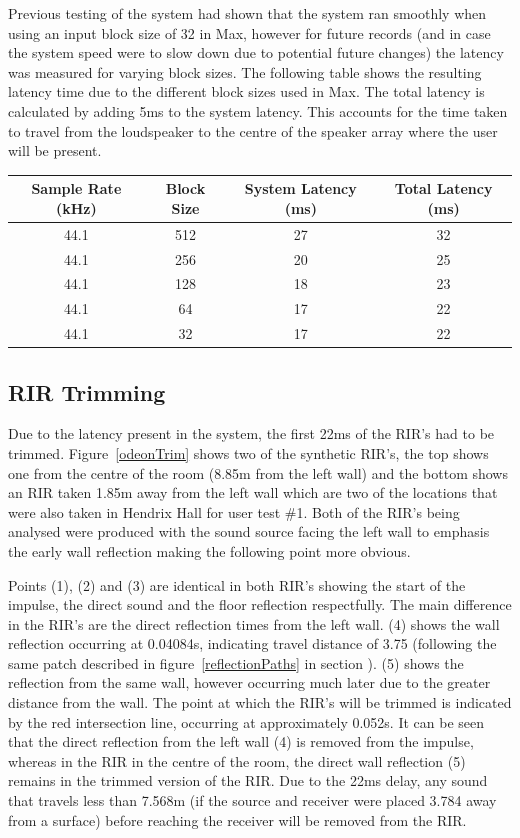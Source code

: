 \documentclass[../../main.tex]{subfiles}
\begin{document}
		Previous testing of the system had shown that the system ran smoothly when using an input block size of 32 in Max, however for future records (and in case the system speed were to slow down due to potential future changes) the latency was measured for varying block sizes. The following table shows the resulting latency time due to the different block sizes used in Max. The total latency is calculated by adding 5ms to the system latency. This accounts for the time taken to travel from the loudspeaker to the centre of the speaker array where the user will be present.


		\begin{center}
		\begin{tabular}{|c |c |c |c|}
		\hline
		Sample Rate (kHz) & Block Size & System Latency (ms) & Total Latency (ms) \\ \hline
		44.1 & 512 & 27 & 32 \\ \hline
		44.1 & 256 & 20 & 25 \\ \hline
		44.1 & 128 & 18 & 23 \\ \hline
		44.1 & 64 & 17 & 22 \\ \hline
		44.1 & 32 & 17 & 22 \\ \hline
		\end{tabular}
		\end{center}


	\subsection{RIR Trimming}
	\label{RIRtrimming}
		Due to the latency present in the system, the first 22ms of the \ac{RIR}'s had to be trimmed. Figure~\ref{odeonTrim} shows two of the synthetic \ac{RIR}'s, the top shows one from the centre of the room (8.85m from the left wall) and the bottom shows an \ac{RIR} taken 1.85m away from the left wall which are two of the locations that were also taken in Hendrix Hall for user test \#1. Both of the \ac{RIR}'s being analysed were produced with the sound source facing the left wall to emphasis the early wall reflection making the following point more obvious. 

		Points (1), (2) and (3) are identical in both \ac{RIR}'s showing the start of the impulse, the direct sound and the floor reflection respectfully. The main difference in the \ac{RIR}'s are the direct reflection times from the left wall. (4) shows the wall reflection occurring at 0.04084s, indicating travel distance of 3.75 (following the same patch described in figure~\ref{reflectionPaths} in section ). (5) shows the reflection from the same wall, however occurring much later due to the greater distance from the wall. The point at which the \ac{RIR}'s will be trimmed is indicated by the red intersection line, occurring at approximately 0.052s. It can be seen that the direct reflection from the left wall (4) is removed from the impulse, whereas in the \ac{RIR} in the centre of the room, the direct wall reflection (5) remains in the trimmed version of the \ac{RIR}. Due to the 22ms delay, any sound that travels less than 7.568m (if the source and receiver were placed 3.784 away from a surface) before reaching the receiver will be removed from the \ac{RIR}. 
\end{document}
